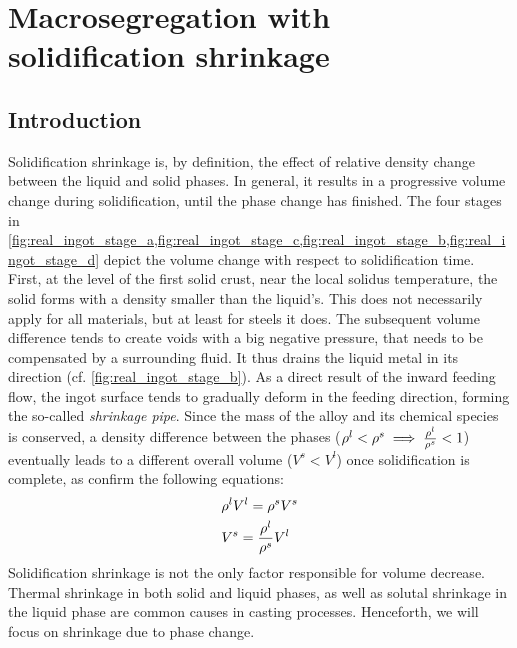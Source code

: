 \chapter{Macrosegregation with solidification shrinkage}
\begin{nolinkcolors} 
\minitoc
\end{nolinkcolors}
\newpage

\section{Introduction}

Solidification shrinkage is, by definition, the effect of relative density change between the liquid and solid phases.
In general, it results in a progressive volume change during solidification, until the phase change has finished. 
The four stages in \cref{fig:real_ingot_stage_a,fig:real_ingot_stage_c,fig:real_ingot_stage_b,fig:real_ingot_stage_d} depict the volume change with 
respect to solidification time.
First, at the level of the first solid crust, near the local solidus temperature, the solid forms with a density smaller than 
the liquid's. This does not necessarily apply for all materials, but at least for steels it does. The subsequent volume difference 
tends to create voids with a big negative pressure, that needs to be compensated by a surrounding fluid. It thus drains 
the liquid metal in its direction (cf. \autoref{fig:real_ingot_stage_b}). As a direct result of the inward feeding flow, the ingot surface
tends to gradually deform in the feeding direction, forming the so-called \emph{shrinkage pipe}. Since the mass of the alloy and its 
chemical species is conserved, a density difference between the phases ($\rho^l < \rho^s \implies \frac{\rho^l}{\rho^s}<1$) eventually leads 
to a different overall volume ($V^s<V^l$) once solidification is complete, as confirm the following equations:
\begin{subequations}
\begin{align}
& \rho^l V^l = \rho^s V^s  \\ 
& V^s = \frac{\rho^l}{\rho^s} V^l
\end{align}
\end{subequations}
Solidification shrinkage is not the only factor responsible for volume decrease. Thermal shrinkage in both solid and liquid phases, as well 
as solutal shrinkage in the liquid phase are common causes in casting processes. Henceforth, we will focus on shrinkage due to phase change.

